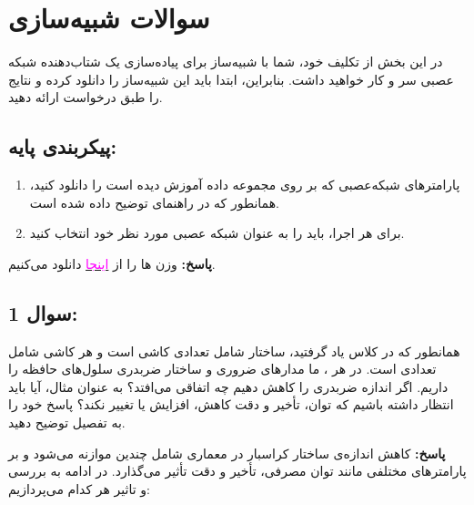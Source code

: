 \documentclass[12pt]{exam}
\begin{document}
\begin{questions}
\begin{enumerate}
\end{enumerate}


		
		
		
		
		
		
	\section*{سوالات شبیه‌سازی}
	\question
	
	
در این بخش از تکلیف خود، شما با شبیه‌ساز  برای پیاده‌سازی یک شتاب‌دهنده شبکه عصبی سر و کار خواهید داشت. بنابراین، ابتدا باید این شبیه‌ساز را دانلود کرده و نتایج را طبق درخواست ارائه دهید.
	
	\subsection*{پیکربندی پایه:}
	\begin{enumerate}
		\item پارامتر‌های شبکه‌عصبی  که بر روی مجموعه داده  آموزش دیده است را دانلود کنید، همانطور که در راهنمای  توضیح داده شده است.
		\item برای هر اجرا، باید  را به عنوان شبکه عصبی مورد نظر خود انتخاب کنید.
	\end{enumerate}
	
	\textbf{پاسخ:} وزن ها را از \href{https://onedrive.live.com/?authkey=%21ANiQIk04073Gdfo&id=8F6F3FD340AC68D1%21332&cid=8F6F3FD340AC68D1}{\textcolor{magenta}{اینجا}}
	دانلود می‌کنیم.
	
	\subsection*{سوال 1:}
	
	همانطور که در کلاس یاد گرفتید، ساختار  شامل تعدادی کاشی است و هر کاشی شامل تعدادی  است. در هر ، ما مدارهای ضروری و ساختار ضربدری سلول‌های حافظه را داریم. اگر اندازه ضربدری را کاهش دهیم چه اتفاقی می‌افتد؟ به عنوان مثال، آیا باید انتظار داشته باشیم که توان، تأخیر و دقت کاهش، افزایش یا تغییر نکند؟ پاسخ خود را به تفصیل توضیح دهید.
	
	
	
	\textbf{پاسخ:}
کاهش اندازه‌ی ساختار کراسبار در معماری  شامل چندین موازنه می‌شود و بر پارامترهای مختلفی مانند توان مصرفی، تأخیر و دقت تأثیر می‌گذارد. در ادامه به بررسی و تاثیر هر کدام می‌پردازیم:
	

\end{questions}
\end{document}
